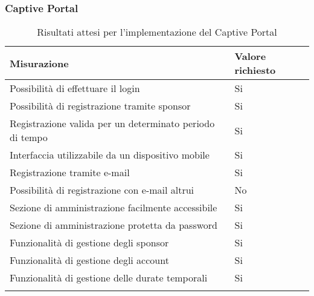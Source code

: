 \documentclass[Tesi.tex]{subfiles}
\begin{document}
\subsubsection{Captive Portal}
\label{table:Risultati attesi per l'implementazione del Captive Portal}
\renewcommand*{\arraystretch}{1.2}
\begin{longtable}[H]{p{9.5cm}p{3.4cm}}
	\rowcolor{CHeader}
	\color{CHeaderText} \textbf{Misurazione} & \color{CHeaderText} \textbf{Valore richiesto} \\
	\endhead
	Possibilità di effettuare il login &
	Si \\
	Possibilità di registrazione tramite sponsor &
	Si \\
	Registrazione valida per un determinato periodo di tempo &
	Si \\
	Interfaccia utilizzabile da un dispositivo mobile &
	Si \\
	Registrazione tramite e-mail &
	Si \\
	Possibilità di registrazione con e-mail altrui &
	No \\
	Sezione di amministrazione facilmente accessibile &
	Si \\
	Sezione di amministrazione protetta da password &
	Si \\
	Funzionalità di gestione degli sponsor &
	Si \\
	Funzionalità di gestione degli account &
	Si \\
	Funzionalità di gestione delle durate temporali &
	Si \\
	
	\hiderowcolors
	\caption{Risultati attesi per l'implementazione del Captive Portal}
\end{longtable}
\end{document}
